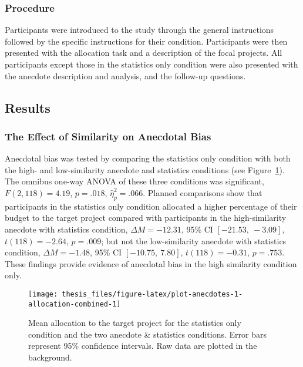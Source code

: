 \documentclass[a4paper, nobind]{templates/ociamthesis}
\theoremstyle{definition}
\theoremstyle{definition}
\theoremstyle{definition}
\theoremstyle{definition}
\theoremstyle{remark}
\begin{document}
\subsubsection{Procedure}

Participants were introduced to the study through the general instructions
followed by the specific instructions for their condition. Participants were
then presented with the allocation task and a description of the focal projects.
All participants except those in the statistics only condition were also
presented with the anecdote description and analysis, and the follow-up
questions.

\hypertarget{results-anecdotes-1}{%
\subsection{Results}\label{results-anecdotes-1}}

\subsubsection{The Effect of Similarity on Anecdotal Bias}

Anecdotal bias was tested by comparing the statistics only condition with both
the high- and low-similarity anecdote and statistics conditions (see
Figure~\ref{fig:plot-anecdotes-1-allocation-combined}). The omnibus one-way
ANOVA of these three conditions was significant,
\(F(2, 118) = 4.19\), \(p = .018\), \(\hat{\eta}^2_p = .066\). Planned comparisons show that
participants in the statistics only condition allocated a higher percentage of
their budget to the target project compared with participants in the
high-similarity anecdote with statistics condition,
\(\Delta M = -12.31\), 95\% CI \([-21.53,~-3.09]\), \(t(118) = -2.64\), \(p = .009\); but not
the low-similarity anecdote with statistics condition,
\(\Delta M = -1.48\), 95\% CI \([-10.75,~7.80]\), \(t(118) = -0.31\), \(p = .753\). These findings
provide evidence of anecdotal bias in the high similarity condition only.



\begin{figure}
\texttt{[image: thesis\_files/figure-latex/plot-anecdotes-1-allocation-combined-1]} \caption{Mean allocation to the target project for the statistics only condition and the two anecdote \& statistics conditions. Error bars represent 95\% confidence intervals. Raw data are plotted in the background.}\label{fig:plot-anecdotes-1-allocation-combined}
\end{figure}
\end{document}
